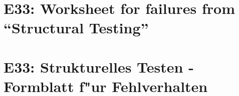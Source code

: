 
\thispagestyle{empty}
\ifenglish
\section*{E33: Worksheet for failures from ``Structural Testing''}

\fi
\ifgerman
\section*{E33: Strukturelles Testen - Formblatt f"ur Fehlverhalten}

\fi

